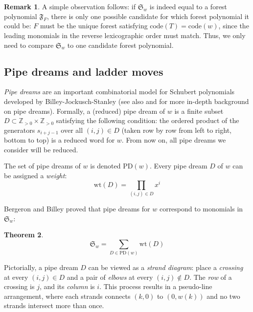 \documentclass{article}
\newtheorem{theorem}{Theorem}[section]
\theoremstyle{definition} %
\newtheorem{remark}[theorem]{Remark}
\begin{document}
\begin{remark}\label{rmk:easyrmk}
    A simple observation follows: if $\mathfrak{S}_w$ is indeed equal to a forest polynomial $\mathfrak{F}_F$, there is only one possible candidate for which forest polynomial it could be: $F$ must be the unique forest satisfying $\text{code}(T) = \text{code}(w)$, since the leading monomials in the reverse lexicographic order must match. Thus, we only need to compare $\mathfrak{S}_w$ to one candidate forest polynomial. 
\end{remark}

\subsection{Pipe dreams and ladder moves}
\textit{Pipe dreams} are an important combinatorial model for Schubert polynomials developed by Billey-Jockusch-Stanley \cite{pipedreams1} (see also \cite{pipedreams2} and \cite{pipedreams} for more in-depth background on pipe dreams). Formally, a (reduced) pipe dream of $w$ is a finite subset $D \subset \mathbb{Z}_{>0} \times \mathbb{Z}_{>0}$ satisfying the following condition: the ordered product of the generators $s_{i+j-1}$ over all $(i,j)\in D$ (taken row by row from left to right, bottom to top) is a reduced word for $w$. From now on, all pipe dreams we consider will be reduced. 

 The set of pipe dreams of $w$ is denoted $\text{PD}(w)$. Every pipe dream $D$ of $w$ can be assigned a \textit{weight}: 
\[\text{wt}(D) = \prod_{(i,j) \in D} x^i\]

Bergeron and Billey \cite{pipedreams} proved that pipe dreams for $w$ correspond to monomials in $\mathfrak{S}_w$:

\vspace{2em}

\begin{theorem}\label{thm:mainpipedreamthm}
    \[\mathfrak{S}_w = \sum_{D \in \text{PD}(w)} \text{wt}(D)\]
\end{theorem}

Pictorially, a pipe dream $D$ can be viewed as a \textit{strand diagram}: place a \textit{crossing} at every $(i,j) \in D$ and a pair of \textit{elbows} at every $(i, j) \notin D$. The \textit{row} of a crossing is $j$, and its \textit{column} is $i$. This process results in a pseudo-line arrangement, where each strands connects $(k, 0)$ to $(0, w(k))$ and no two strands intersect more than once. 

\vspace{2em}
\end{document}
